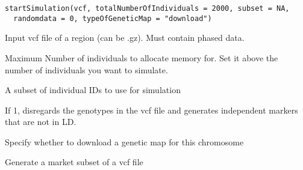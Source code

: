 \documentclass[letterpaper]{book}
\begin{document}
%
\begin{Usage}
\begin{verbatim}
startSimulation(vcf, totalNumberOfIndividuals = 2000, subset = NA,
  randomdata = 0, typeOfGeneticMap = "download")
\end{verbatim}
\end{Usage}
%
\begin{Arguments}
\begin{ldescription}
\item[\code{vcf}] Input vcf file of a region (can be .gz). Must contain phased data.

\item[\code{totalNumberOfIndividuals}] Maximum Number of individuals to allocate memory for. Set it above the number of individuals you want to simulate.

\item[\code{subset}] A subset of individual IDs to use for simulation

\item[\code{randomdata}] If 1, disregards the genotypes in the vcf file and generates independent markers that are not in LD.

\item[\code{typeOfGeneticMap}] Specify whether to download a genetic map for this chromosome
\end{ldescription}
\end{Arguments}
%
\begin{Examples}
\end{Examples}
%
\begin{Description}\relax
Generate a market subset of a vcf file
\end{Description}
\end{document}
